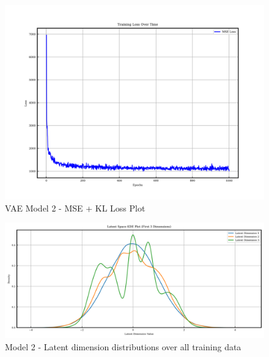 \documentclass{article}
\begin{document}
\begin{figure}[H]
\centering
    \includegraphics[width=0.75\linewidth]{figures/VAEmodels/model2/loss_plot.png}
    \caption{VAE Model 2 - MSE + KL Loss Plot}
    \label{fig:model2_loss_plot}
\end{figure}

\begin{figure}[H]
    \centering
    \includegraphics[width=0.75\linewidth]{figures/VAEmodels/model2/latent_distribution.png}
    \caption{Model 2 - Latent dimension distributions over all training data}
    \label{fig:model2_latent_dist}
\end{figure}
\end{document}
